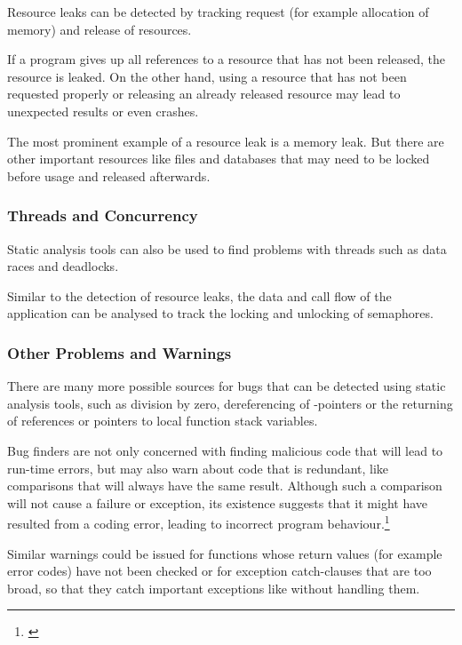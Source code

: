 Resource leaks can be detected by tracking request (for example allocation of memory) and release of resources.

If a program gives up all references to a resource that has not been released, the resource is leaked. On the other hand, using a resource that has not been requested properly or releasing an already released resource may lead to unexpected results or even crashes.

The most prominent example of a resource leak is a memory leak. But there are other important resources like files and databases that may need to be locked before usage and released afterwards.

\subsubsection{Threads and Concurrency}

Static analysis tools can also be used to find problems with threads such as data races and deadlocks.

Similar to the detection of resource leaks, the data and call flow of the application can be analysed to track the locking and unlocking of semaphores.

\subsubsection{Other Problems and Warnings}

There are many more possible sources for bugs that can be detected using static analysis tools, such as division by zero, dereferencing of -pointers or the returning of \linebreak references or pointers to local function stack variables.

Bug finders are not only concerned with finding malicious code that will lead to run-time errors, but may also warn about code that is redundant, like comparisons that will always have the same result. Although such a comparison will not cause a failure or exception, its existence suggests that it might have resulted from a coding error, leading to incorrect program behaviour.\footnote{\citep[1]{UsingSAToFindBugs}}

Similar warnings could be issued for functions whose return values (for example error codes) have not been checked or for exception catch-clauses that are too broad, so that they catch important exceptions like  without handling them.

